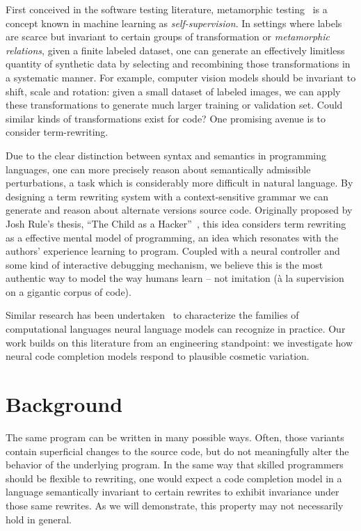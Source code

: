 \documentclass[usenames,dvipsnames]{article} %
\begin{document}
  First conceived in the software testing literature, metamorphic testing~\cite{chen1995metamorphic} is a concept known in machine learning as \textit{self-supervision}. In settings where labels are scarce but invariant to certain groups of transformation or \textit{metamorphic relations}, given a finite labeled dataset, one can generate an effectively limitless quantity of synthetic data by selecting and recombining those transformations in a systematic manner. For example, computer vision models should be invariant to shift, scale and rotation: given a small dataset of labeled images, we can apply these transformations to generate much larger training or validation set. Could similar kinds of transformations exist for code? One promising avenue is to consider term-rewriting.

  Due to the clear distinction between syntax and semantics in programming languages, one can more precisely reason about semantically admissible perturbations, a task which is considerably more difficult in natural language. By designing a term rewriting system with a context-sensitive grammar we can generate and reason about alternate versions source code. Originally proposed by Josh Rule's thesis, ``The Child as a Hacker''~\citep{rule2020child}, this idea considers term rewriting as a effective mental model of programming, an idea which resonates with the authors' experience learning to program. Coupled with a neural controller and some kind of interactive debugging mechanism, we believe this is the most authentic way to model the way humans learn -- not imitation (à la supervision on a gigantic corpus of code).

  Similar research has been undertaken~\citep{weiss2018practical, chirkova2020empirical, chen2021evaluating} to characterize the families of computational languages neural language models can recognize in practice. Our work builds on this literature from an engineering standpoint: we investigate how neural code completion models respond to plausible cosmetic variation.


  \pagebreak\section{Background}\label{sec:background}

  The same program can be written in many possible ways. Often, those variants contain superficial changes to the source code, but do not meaningfully alter the behavior of the underlying program. In the same way that skilled programmers should be flexible to rewriting, one would expect a code completion model in a language semantically invariant to certain rewrites to exhibit invariance under those same rewrites. As we will demonstrate, this property may not necessarily hold in general.
\end{document}

